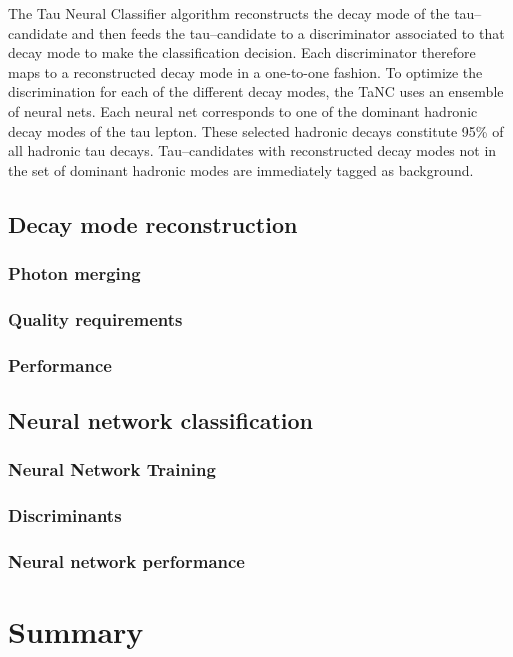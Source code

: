 The Tau Neural Classifier algorithm reconstructs the decay mode of the
tau--candidate and then feeds the tau--candidate to a discriminator associated
to that decay mode to make the classification decision.  Each discriminator
therefore maps to a reconstructed decay mode in a one-to-one fashion.  To
optimize the discrimination for each of the different decay modes, the TaNC uses
an ensemble of neural nets.  Each neural net corresponds to one of the dominant
hadronic decay modes of the tau lepton.  These selected hadronic decays
constitute 95\% of all hadronic tau decays.  Tau--candidates with reconstructed
decay modes not in the set of dominant hadronic modes are immediately tagged as
background.  

\subsection{Decay mode reconstruction}
\label{sec:decay_mode_reco}

\subsubsection{Photon merging}

\subsubsection{Quality requirements}

\subsubsection{Performance}


\subsection{Neural network classification}
\subsubsection{Neural Network Training}

\subsubsection{Discriminants}
\label{sec:tanc_nn_discriminants}

\subsubsection{Neural network performance}

\section{Summary}


\ifx\master\undefined\fi
